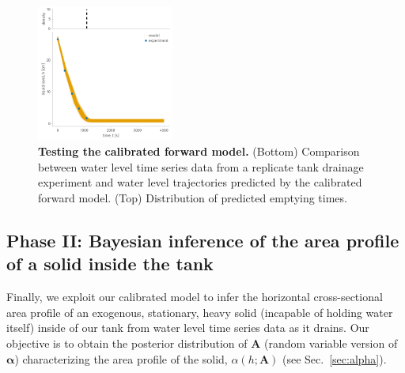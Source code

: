 \documentclass[a4paper,fleqn]{cas-dc}
\begin{document}
\begin{figure}[h!]
    \centering
    	\includegraphics[width=0.4\textwidth]{test.pdf}
    \caption{
      \textbf{Testing the calibrated forward model.}
      (Bottom) Comparison between water level time series data from a replicate tank drainage experiment and water level trajectories predicted by the calibrated forward model. 
      (Top) Distribution of predicted emptying times.
      } \label{fig:test}
\end{figure}

\subsection{Phase II: Bayesian inference of the area profile of a solid inside the tank} \label{sec:phaseII}
Finally, we exploit our calibrated model to infer the horizontal cross-sectional area profile of an exogenous, stationary, heavy solid (incapable of holding water itself) inside of our tank from water level time series data as it drains.
Our objective is to obtain the posterior distribution of $\mathbf{A}$ (random variable version of $\boldsymbol \alpha$) characterizing the area profile of the solid, $\alpha(h; \mathbf{A})$ (see Sec.~\ref{sec:alpha}).
\end{document}
